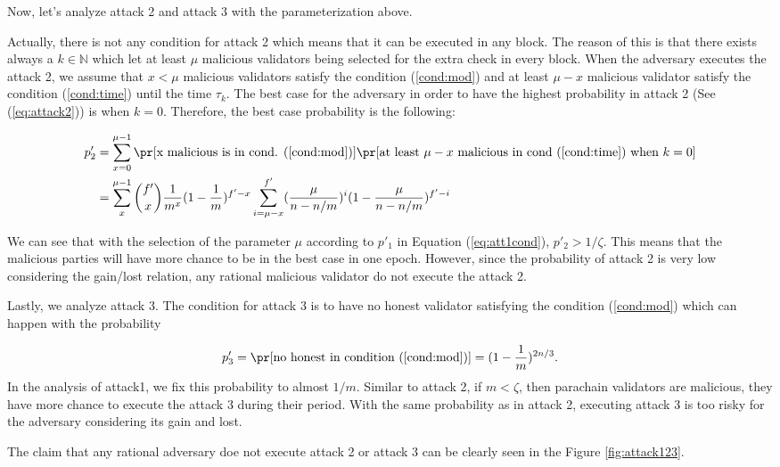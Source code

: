 Now, let's analyze attack 2 and attack 3 with the parameterization above.

Actually, there is not any condition for attack 2 which means that it can be executed in any block. The reason of this is that there exists always a $k \in \mathbb{N}$ which let at least $\mu$ malicious validators being selected for the extra check in every block. When the adversary executes the attack 2, we assume that $x < \mu$ malicious validators satisfy the condition (\ref{cond:mod}) and at least $\mu - x$ malicious validator satisfy the condition (\ref{cond:time}) until the time $\tau_k$. The best case for the adversary in order to have the highest probability in attack 2 (See (\ref{eq:attack2})) is when $k = 0$. Therefore, the best case probability is the following:

\begin{align}\label{eq:att2cond}
    p'_2 &= \sum_{x=0}^{\mu-1}\pr[\text{x malicious is in cond. (\ref{cond:mod})}]\pr[\text{at least }\mu-x\text{ malicious in cond (\ref{cond:time}) when } k = 0] \nonumber \\
    &= \sum_x^{\mu-1}\binom{f'}{x}\frac{1}{m^{x}}(1-\frac{1}{m})^{f'-x}\sum_{i = \mu-x}^{f'}(\frac{\mu}{n-n/m})^{i}(1-\frac{\mu}{n-n/m})^{f'-i}
\end{align} 

We can see that with the selection of the parameter $\mu$ according to $p'_1$ in Equation (\ref{eq:att1cond}), $p'_2 > 1/\zeta$. This means that the malicious parties will have more chance to be in the best case in one epoch. However, since the probability of attack 2 is very low considering the gain/lost relation, any rational malicious validator do not execute the attack 2.


Lastly, we analyze attack 3. The  condition for attack 3 is to have no honest validator satisfying the condition (\ref{cond:mod}) which can happen with the probability

\begin{equation}\label{eq:att3cond}
    p'_3 = \pr[\text{no honest in condition (\ref{cond:mod})}] = (1-\frac{1}{m})^{2n/3}.
\end{equation}
In the analysis of attack1, we fix this probability to almost $1/m$. Similar to attack 2, if $m < \zeta$, then parachain validators are malicious, they have more chance to execute the attack 3 during their period. With the same probability as in attack 2, executing attack 3 is too risky for the adversary considering its gain and lost.

The claim that any rational adversary doe not execute attack 2 or attack 3 can be clearly seen in the  Figure \ref{fig:attack123}.

